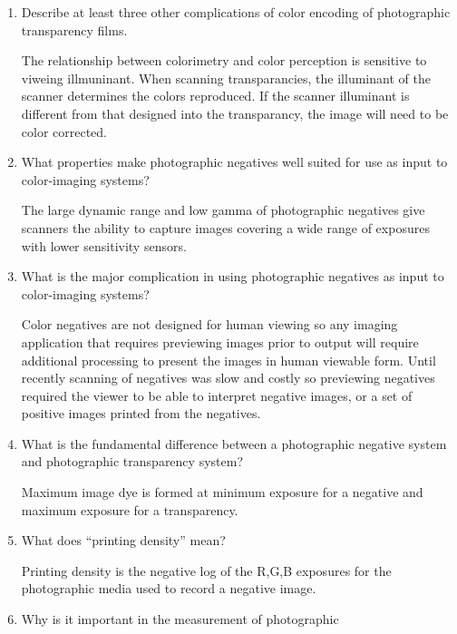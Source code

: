 \begin{enumerate}
\item   Describe at least three other complications of color
encoding of photographic transparency films.
\newline \par The relationship between colorimetry and color
perception is sensitive to viweing illmuninant.  When scanning
transparancies, the illuminant of the scanner determines the
colors reproduced.  If the scanner illuminant is different from
that designed into the transparancy, the image will need to be
color corrected.

\item  What properties make photographic negatives well suited for
use as input to color-imaging systems?
\newline \par The large dynamic range and low gamma of
photographic negatives give scanners the ability to capture images
covering a wide range of exposures with lower sensitivity sensors.
\newline
\item What is the major complication in using photographic
negatives as input to color-imaging systems?
\newline \par Color negatives are not designed for human viewing
so any imaging application that requires previewing images prior
to output will require additional processing to present the images
in human viewable form.  Until recently scanning of negatives was
slow and costly so previewing negatives required the viewer to be
able to interpret negative images, or a set of positive images
printed from the negatives.
\newline
\item  What is the fundamental difference between a
photographic negative system and photographic transparency system?
\newline \par Maximum image dye is formed at minimum exposure for
a negative and maximum exposure for a transparency.
\newline
\item  What does “printing density” mean?
\newline \par Printing density is the negative log of the
R,G,B exposures for the photographic media used to record a
negative image.
\newline
\item  Why is it important in the measurement of photographic

\end{enumerate}
